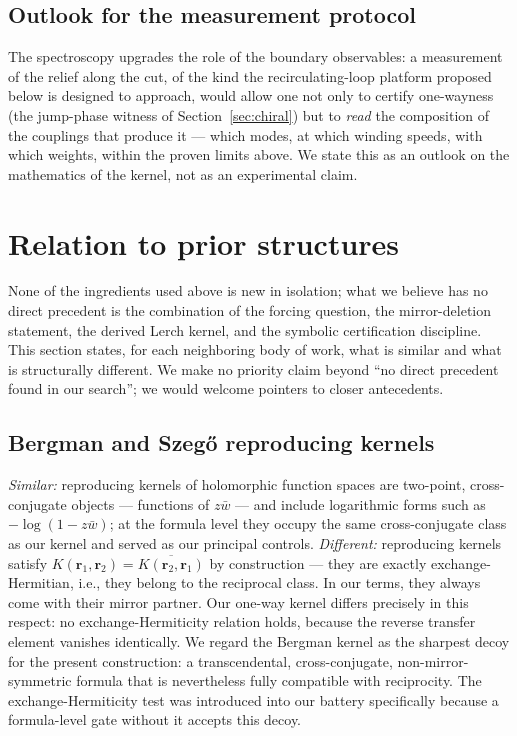 \documentclass[11pt,a4paper]{article}
\newcommand{\wb}{\bar{w}}
\begin{document}
\subsection{Outlook for the measurement protocol}
\label{sec:specoutlook}

The spectroscopy upgrades the role of the boundary observables: a
measurement of the relief along the cut, of the kind the
recirculating-loop platform proposed below is designed to approach,
would allow one not only to certify one-wayness (the jump-phase witness
of Section~\ref{sec:chiral}) but to \emph{read} the composition of the
couplings that produce it --- which modes, at which winding speeds, with
which weights, within the proven limits above. We state this as an
outlook on the mathematics of the kernel, not as an experimental claim.

\section{Relation to prior structures}
\label{sec:prior}

None of the ingredients used above is new in isolation; what we believe has no
direct precedent is the combination of the forcing question, the mirror-deletion
statement, the derived Lerch kernel, and the symbolic certification discipline.
This section states, for each neighboring body of work, what is similar and what
is structurally different. We make no priority claim beyond ``no direct precedent
found in our search''; we would welcome pointers to closer antecedents.

\subsection{Bergman and Szeg\H{o} reproducing kernels}

\emph{Similar:} reproducing kernels of holomorphic function spaces are two-point,
cross-conjugate objects --- functions of $z\wb$ --- and include logarithmic forms
such as $-\log(1 - z\wb)$; at the formula level they occupy the same
cross-conjugate class as our kernel and served as our principal controls.
\emph{Different:} reproducing kernels satisfy
$K(\mathbf{r}_1, \mathbf{r}_2) = \overline{K(\mathbf{r}_2, \mathbf{r}_1)}$ by
construction --- they are exactly exchange-Hermitian, i.e., they belong to the
reciprocal class. In our terms, they always come with their mirror partner. Our
one-way kernel differs precisely in this respect: no exchange-Hermiticity
relation holds, because the reverse transfer element vanishes identically. We
regard the Bergman kernel as the sharpest decoy for the present construction: a
transcendental, cross-conjugate, non-mirror-symmetric formula that is
nevertheless fully compatible with reciprocity. The exchange-Hermiticity test
was introduced into our battery specifically because a formula-level gate
without it accepts this decoy.
\end{document}
